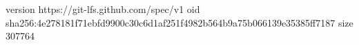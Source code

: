 version https://git-lfs.github.com/spec/v1
oid sha256:4e278181f71ebfd9900c30c6d1af251f4982b564b9a75b066139e35385ff7187
size 307764
